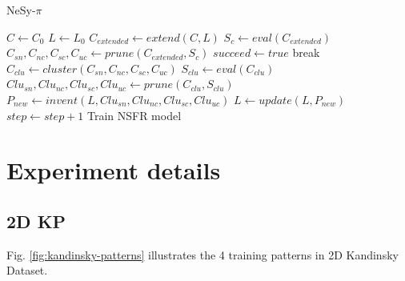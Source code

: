 \documentclass[
]{ceurart}
\begin{document}
	\begin{algorithm}
		\caption{NeSy-$ \pi $}\label{alg:pi}
		\begin{algorithmic}
			\State $C \gets C_0$
			\State $L \gets L_0$
			\State $ C_{extended} \gets extend(C, L)$
			\State $S_c \gets  eval (C_{extended})$
			\State $C_{sn},C_{nc},C_{sc}, C_{uc} \gets  prune(C_{extended}, S_c)$
			\EndFor 
			\State $succeed \gets true$
			\State break
			\EndIf 
			\State $ C_{clu} \gets  cluster(C_{sn},C_{nc},C_{sc}, C_{uc} ) $
			\State $ S_{clu} \gets eval(C_{clu})$
			\State $ Clu_{sn}, Clu_{nc}, Clu_{sc}, Clu_{uc} \gets  prune(C_{clu}, S_{clu})$  
			\State $P_{new} \gets invent(L, Clu_{sn}, Clu_{nc}, Clu_{sc}, Clu_{uc})$
			\State $ L \gets update(L, P_{new})  $
			\State $step \gets step + 1$
			\EndWhile
			\State Train NSFR model
		\end{algorithmic}
	\end{algorithm}
	
	
	\section{Experiment details }
	\newpage
	\subsection{2D KP}
	
	Fig. \ref{fig:kandinsky-patterns} illustrates the 4 training patterns in 2D Kandinsky Dataset. 
	
\end{document}
